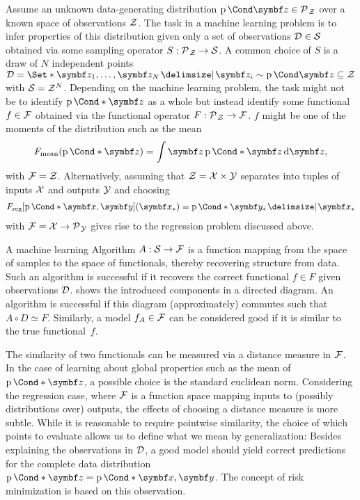 Assume an unknown data-generating distribution $\Prob{\mat{z}} \in \Probs{\Zc}$ over a known space of observations $\mathcal{Z}$.
The task in a machine learning problem is to infer properties of this distribution given only a set of observations $\mathcal{D} \in \mathcal{S}$ obtained via some sampling operator $S : \operatorname{\mathcal{P}\mkern1mu}_{\mathcal{Z}} \to \mathcal{S}$.
A common choice of $S$ is a draw of $N$ independent points $\Dc = \Set*{\mat{z_1}, \dots, \mat{z_N} \with \mat{z_i} \sim \Prob{\mat{z}}} \subseteq \Zc$ with $\mathcal{S} = \mathcal{Z}^N$.
Depending on the machine learning problem, the task might not be to identify $\Prob*{\mat{z}}$ as a whole but instead identify some functional $f \in \mathcal{F}$ obtained via the functional operator $F : \operatorname{\mathcal{P}\mkern1mu}_{\mathcal{Z}} \to \mathcal{F}$.
$f$ might be one of the moments of the distribution such as the mean
\begin{align}
    F_{\text{mean}}(\Prob*{\mat{z}}) = \int \mat{z} \Prob*{\mat{z}} \diff \mat{z},
\end{align}
with $\mathcal{F} = \mathcal{Z}$.
Alternatively, assuming that $\mathcal{Z} = \mathcal{X} \times \mathcal{Y}$ separates into tuples of inputs $\mathcal{X}$ and outputs $\mathcal{Y}$ and choosing
\begin{align}
    F_{\text{reg}}[\Prob*{\mat{x}, \mat{y}}](\mat{x_\ast}) = \Prob*{\mat{y_\ast} \given \mat{x_\ast}}
\end{align}
with $\mathcal{F} = \mathcal{X} \to \operatorname{\mathcal{P}\mkern1mu}_{\mathcal{Y}}$ gives rise to the regression problem discussed above.

A machine learning Algorithm $A : \mathcal{S} \to \mathcal{F}$ is a function mapping from the space of samples to the space of functionals, thereby recovering structure from data.
Such an algorithm is successful if it recovers the correct functional $f \in F$ given observations $\mathcal{D}$.
 shows the introduced components in a directed diagram.
An algorithm is successful if this diagram (approximately) commutes such that $A \circ D \simeq F$.
Similarly, a model $f_A \in \mathcal{F}$ can be considered good if it is similar to the true functional~$f$.

The similarity of two functionals can be measured via a distance measure in $\mathcal{F}$.
In the case of learning about global properties such as the mean of $\Prob*{\mat{z}}$, a possible choice is the standard euclidean norm.
Considering the regression case, where $\mathcal{F}$ is a function space mapping inputs to (possibly distributions over) outputs, the effects of choosing a distance measure is more subtle.
While it is reasonable to require pointwise similarity, the choice of which points to evaluate allows us to define what we mean by generalization:
Besides explaining the observations in $\mathcal{D}$, a good model should yield correct predictions for the complete data distribution $\Prob*{\mat{z}} = \Prob*{\mat{x}, \mat{y}}$.
The concept of risk minimization is based on this observation.

